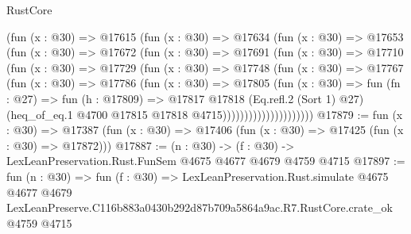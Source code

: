\begin{lexlean}{RustCore}
\begin{coremodule}
                    (fun (x : @30) =>
                    @17615
                      (fun (x : @30) =>
                      @17634
                        (fun (x : @30) =>
                        @17653
                          (fun (x : @30) =>
                          @17672
                            (fun (x : @30) =>
                            @17691
                              (fun (x : @30) =>
                              @17710
                                (fun (x : @30) =>
                                @17729
                                  (fun (x : @30) =>
                                  @17748
                                    (fun (x : @30) =>
                                    @17767
                                      (fun (x : @30) =>
                                      @17786
                                        (fun (x : @30) =>
                                        @17805
                                          (fun (x : @30) =>
                                          fun (fn : @27) =>
                                          fun (h : @17809) =>
                                          @17817
                                            @17818
                                            (Eq.refl.{2} (Sort 1) @27)
                                            (heq_of_eq.{1}
                                              @4700
                                              @17815
                                              @17818
                                              @4715)))))))))))))))))))))
@17879 := fun (x : @30) =>
  @17387 (fun (x : @30) => @17406 (fun (x : @30) => @17425 (fun (x : @30) => @17872)))
@17887 := (n : @30) -> (f : @30) -> LexLeanPreservation.Rust.FunSem @4675 @4677 @4679 @4759 @4715
@17897 := fun (n : @30) =>
  fun (f : @30) =>
  LexLeanPreservation.Rust.simulate
    @4675
    @4677
    @4679
    LexLeanPreserve.C116b883a0430b292d87b709a5864a9ac.R7.RustCore.crate_ok
    @4759
    @4715
\end{coremodule}
\end{lexlean}
